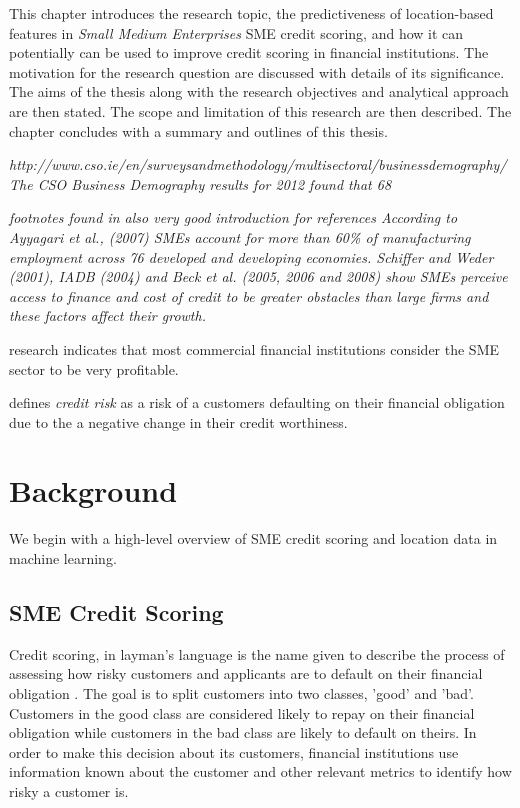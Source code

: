 This chapter introduces the research topic, the predictiveness of location-based features in \textit{Small Medium Enterprises} SME credit scoring, and how it can potentially can be used to improve credit scoring in financial institutions. The motivation for the research question are discussed with details of its significance. The aims of the thesis along with the research objectives and analytical approach are then stated. The scope and limitation of this research are then described. The chapter concludes with a summary and outlines of this thesis.

\textit{
http://www.cso.ie/en/surveysandmethodology/multisectoral/businessdemography/
The CSO Business Demography results for 2012 found that 68%
}


\textit{footnotes found in \citep{rocha_status_2011} also very good introduction for references
According to Ayyagari et al., (2007) SMEs account for more than 60\% of manufacturing employment across 76
developed and developing economies. 
Schiffer and Weder (2001), IADB (2004) and Beck et al. (2005, 2006 and 2008) show SMEs perceive access to
finance and cost of credit to be greater obstacles than large firms and these factors affect their growth.
}


\cite{beck_bank_2008} research indicates that most commercial financial institutions consider the SME sector to be very profitable. 


\cite{anderson_credit_2007} defines \textit{credit risk} as a risk of a customers defaulting on their financial obligation due to the a negative change in their credit worthiness.


\section{Background}

We begin with a high-level overview of SME credit scoring and location data in machine learning.

\subsection{SME Credit Scoring}

Credit scoring, in layman's language is the name given to describe the process of assessing how risky customers and applicants are to default on their financial obligation \citep{hand_statistical_1997}. The goal is to split customers into two classes, 'good' and 'bad'. Customers in the good class are considered likely to repay on their financial obligation while customers in the bad class are likely to default on theirs. In order to make this decision about its customers, financial institutions use information known about the customer and other relevant metrics to identify how risky a customer is. 


